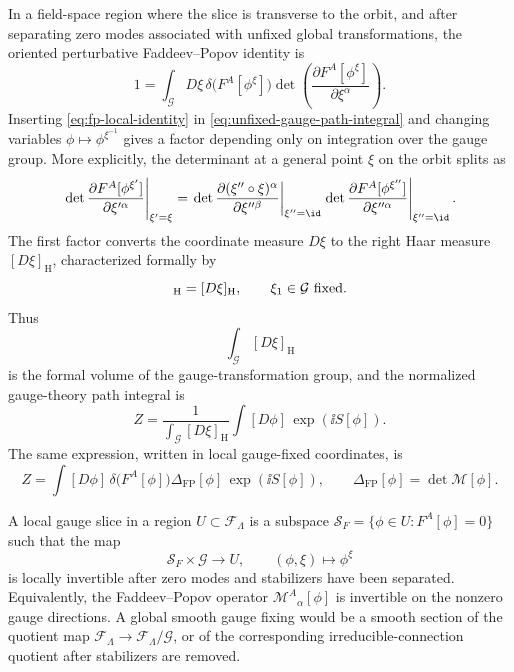In a field-space region where the slice is transverse to the orbit, and after
separating zero modes associated with unfixed global transformations, the
oriented perturbative Faddeev--Popov identity is
\begin{equation}
  1
  =
  \int_{\mathcal G}D\xi\,
  \delta\bigl(F^A[\phi^\xi]\bigr)
  \det\left(
    \frac{\partial F^A[\phi^\xi]}{\partial\xi^\alpha}
  \right).
  \label{eq:fp-local-identity}
\end{equation}
Inserting \eqref{eq:fp-local-identity} in
\eqref{eq:unfixed-gauge-path-integral} and changing variables
\(\phi\mapsto \phi^{\xi^{-1}}\) gives a factor depending only on integration
over the gauge group.  More explicitly, the determinant at a general point
\(\xi\) on the orbit splits as
\[
  \left.
  \det
  \frac{\partial F^A[\phi^{\xi'}]}{\partial\xi'^\alpha}
  \right|_{\xi'=\xi}
  =
  \left.
  \det
  \frac{\partial(\xi''\circ\xi)^\alpha}{\partial\xi''^\beta}
  \right|_{\xi''=\id}
  \left.
  \det
  \frac{\partial F^A[\phi^{\xi''}]}{\partial\xi''^\alpha}
  \right|_{\xi''=\id}.
\]
The first factor converts the coordinate measure \(D\xi\) to the right Haar
measure \([D\xi]_{\mathrm H}\), characterized formally by
\begin{equation}
  [D(\xi\circ\xi_1)]_{\mathrm H}=[D\xi]_{\mathrm H},
  \qquad
  \xi_1\in\mathcal G \ \hbox{fixed}.
  \label{eq:functional-haar-measure-property}
\end{equation}
Thus
\[
  \int_{\mathcal G}[D\xi]_{\mathrm H}
\]
is the formal volume of the gauge-transformation group, and the normalized
gauge-theory path integral is
\begin{equation}
  Z
  =
  \frac{1}{\int_{\mathcal G}[D\xi]_{\mathrm H}}
  \int[D\phi]\,\exp(\ii S[\phi]).
  \label{eq:gauge-theory-divide-by-gauge-volume}
\end{equation}
The same expression, written in local gauge-fixed coordinates, is
\begin{equation}
  Z
  =
  \int[D\phi]\,
  \delta\bigl(F^A[\phi]\bigr)
  \Delta_{\mathrm{FP}}[\phi]\,
  \exp(\ii S[\phi]),
  \qquad
  \Delta_{\mathrm{FP}}[\phi]=\det\mathcal M[\phi].
  \label{eq:fp-gauge-fixed-integral}
\end{equation}

\begin{definition}
A local gauge slice in a region \(U\subset\mathcal F_\Lambda\) is a subspace
\(\mathcal S_F=\{\phi\in U:F^A[\phi]=0\}\) such that the map
\[
  \mathcal S_F\times\mathcal G\longrightarrow U,
  \qquad
  (\phi,\xi)\longmapsto \phi^\xi
\]
is locally invertible after zero modes and stabilizers have been separated.
Equivalently, the Faddeev--Popov operator
\(\mathcal M^A{}_\alpha[\phi]\) is invertible on the nonzero gauge directions.
A global smooth gauge fixing would be a smooth section of the quotient map
\(\mathcal F_\Lambda\to\mathcal F_\Lambda/\mathcal G\), or of the
corresponding irreducible-connection quotient after stabilizers are removed.
\end{definition}


